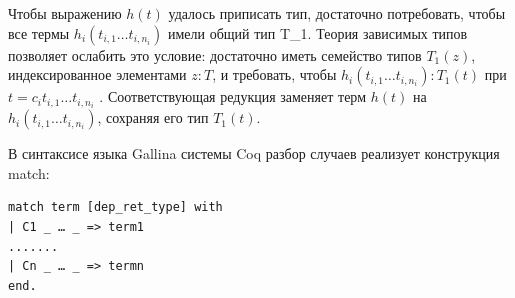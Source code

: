 Чтобы выражению $h(t)$ удалось приписать тип, достаточно потребовать,
чтобы все термы $h_{i}(t_{i,1} \ldots t_{i,n_{i}})$ имели общий тип T_{1}. Теория зависимых
типов позволяет ослабить это условие: достаточно иметь семейство типов
$T_{1}(z)$, индексированное элементами $z :T$, и требовать, чтобы
$h_{i}(t_{i,1} \ldots t_{i,n_{i}}) :T_{1}(t)$ при $t = c_{i}t_{i,1} \ldots t_{i,n_{i}}$ .
Соответствующая редукция  заменяет терм $h(t)$ на $h_{i}(t_{i,1} \ldots t_{i,n_{i}})$,
сохраняя его тип $T_{1}(t)$.

В синтаксисе языка Gallina системы Coq разбор случаев реализует конструкция match:
\begin{verbatim}
match term [dep_ret_type] with
| C1 _ … _ => term1
.......
| Cn _ … _ => termn
end.
\end{verbatim}